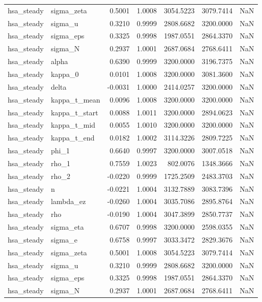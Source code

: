 \begin{tabular}{llrrrrl}
hsa\_steady & sigma\_zeta & 0.5001 & 1.0008 & 3054.5223 & 3079.7414 & NaN \\
hsa\_steady & sigma\_u & 0.3210 & 0.9999 & 2808.6682 & 3200.0000 & NaN \\
hsa\_steady & sigma\_eps & 0.3325 & 0.9998 & 1987.0551 & 2864.3370 & NaN \\
hsa\_steady & sigma\_N & 0.2937 & 1.0001 & 2687.0684 & 2768.6411 & NaN \\
hsa\_steady & alpha & 0.6390 & 0.9999 & 3200.0000 & 3196.7375 & NaN \\
hsa\_steady & kappa\_0 & 0.0101 & 1.0008 & 3200.0000 & 3081.3600 & NaN \\
hsa\_steady & delta & -0.0031 & 1.0000 & 2414.0257 & 3200.0000 & NaN \\
hsa\_steady & kappa\_t\_mean & 0.0096 & 1.0008 & 3200.0000 & 3200.0000 & NaN \\
hsa\_steady & kappa\_t\_start & 0.0088 & 1.0011 & 3200.0000 & 2894.0623 & NaN \\
hsa\_steady & kappa\_t\_mid & 0.0055 & 1.0010 & 3200.0000 & 3200.0000 & NaN \\
hsa\_steady & kappa\_t\_end & 0.0182 & 1.0002 & 3114.3226 & 2809.7225 & NaN \\
hsa\_steady & phi\_1 & 0.6640 & 0.9997 & 3200.0000 & 3007.0518 & NaN \\
hsa\_steady & rho\_1 & 0.7559 & 1.0023 & 802.0076 & 1348.3666 & NaN \\
hsa\_steady & rho\_2 & -0.0220 & 0.9999 & 1725.2509 & 2483.3703 & NaN \\
hsa\_steady & n & -0.0221 & 1.0004 & 3132.7889 & 3083.7396 & NaN \\
hsa\_steady & lambda\_ez & -0.0260 & 1.0004 & 3035.7086 & 2895.8764 & NaN \\
hsa\_steady & rho & -0.0190 & 1.0004 & 3047.3899 & 2850.7737 & NaN \\
hsa\_steady & sigma\_eta & 0.6707 & 0.9998 & 3200.0000 & 2598.0355 & NaN \\
hsa\_steady & sigma\_e & 0.6758 & 0.9997 & 3033.3472 & 2829.3676 & NaN \\
hsa\_steady & sigma\_zeta & 0.5001 & 1.0008 & 3054.5223 & 3079.7414 & NaN \\
hsa\_steady & sigma\_u & 0.3210 & 0.9999 & 2808.6682 & 3200.0000 & NaN \\
hsa\_steady & sigma\_eps & 0.3325 & 0.9998 & 1987.0551 & 2864.3370 & NaN \\
hsa\_steady & sigma\_N & 0.2937 & 1.0001 & 2687.0684 & 2768.6411 & NaN \\

\end{tabular}
